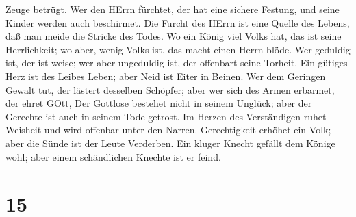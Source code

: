 Zeuge betrügt.  Wer den HErrn fürchtet, der hat eine
sichere Festung, und seine Kinder werden auch beschirmet. 
Die Furcht des HErrn ist eine Quelle des Lebens, daß man meide die
Stricke des Todes.  Wo ein König viel Volks hat, das ist
seine Herrlichkeit; wo aber, wenig Volks ist, das macht einen Herrn
blöde.  Wer geduldig ist, der ist weise; wer aber
ungeduldig ist, der offenbart seine Torheit.  Ein gütiges
Herz ist des Leibes Leben; aber Neid ist Eiter in Beinen. 
Wer dem Geringen Gewalt tut, der lästert desselben Schöpfer; aber wer
sich des Armen erbarmet, der ehret GOtt,  Der Gottlose
bestehet nicht in seinem Unglück; aber der Gerechte ist auch in seinem
Tode getrost.  Im Herzen des Verständigen ruhet Weisheit
und wird offenbar unter den Narren.  Gerechtigkeit erhöhet
ein Volk; aber die Sünde ist der Leute Verderben.  Ein
kluger Knecht gefällt dem Könige wohl; aber einem schändlichen Knechte
ist er feind.

\hypertarget{section-14}{%
\section{15}\label{section-14}}

